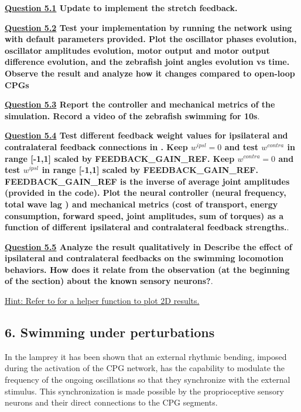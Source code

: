 \documentclass{cmc}
\begin{document}
\textbf{\underline{Question 5.1} Update  to implement the stretch feedback.}

\textbf{\underline{Question 5.2} Test your implementation by running the network using  with default parameters provided. Plot the oscillator phases evolution, oscillator amplitudes evolution, motor output and motor output difference evolution, and the zebrafish joint angles evolution vs time. Observe the result and analyze how it changes compared to open-loop CPGs}

\textbf{\underline{Question 5.3} Report the controller and mechanical metrics of the simulation.  Record a video of the zebrafish swimming for 10s}.

\textbf{\underline{Question 5.4} Test different feedback weight values for ipsilateral and contralateral feedback connections in . Keep $w^{ipsl}=0$ and test $w^{contra}$ in range [-1,1] scaled by FEEDBACK\_GAIN\_REF. Keep $w^{contra}=0$ and test $w^{ipsl}$ in range [-1,1] scaled by FEEDBACK\_GAIN\_REF. FEEDBACK\_GAIN\_REF is the inverse of average joint amplitudes (provided in the code). Plot the neural controller (neural frequency, total wave lag ) and mechanical metrics (cost of transport, energy consumption, forward speed, joint amplitudes, sum of torques) as a function of different ipsilateral and contralateral feedback strengths.}.

\textbf{\underline{Question 5.5} Analyze the result qualitatively in Describe the effect of ipsilateral and contralateral feedbacks on the swimming locomotion behaviors. How does it relate from the observation (at the beginning of the section) about the known sensory neurons?}.

\underline{Hint: Refer to  for a helper function to plot 2D results.}

\subsection*{6. Swimming under perturbations}

In the lamprey it has been shown that an external rhythmic bending, imposed during the activation of the CPG network, has the capability to modulate the frequency of the ongoing oscillations so that they synchronize with the external stimulus. This synchronization is made possible by the proprioceptive sensory neurons and their direct connections to the CPG segments.
\end{document}
